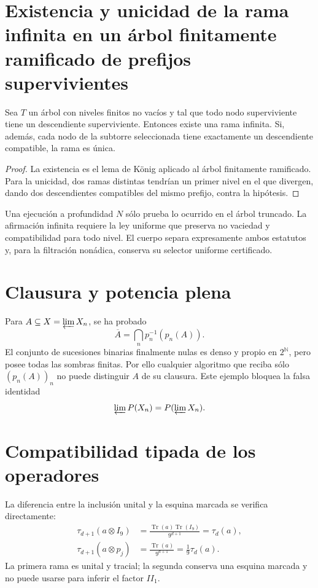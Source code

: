 \section{Existencia y unicidad de la rama infinita en un árbol finitamente ramificado de prefijos supervivientes}

\begin{lemma}
Sea \(T\) un árbol con niveles finitos no vacíos y tal que todo nodo
superviviente tiene un descendiente superviviente. Entonces existe una rama
infinita. Si, además, cada nodo de la subtorre seleccionada tiene exactamente
un descendiente compatible, la rama es única.
\end{lemma}

\begin{proof}
La existencia es el lema de König aplicado al árbol finitamente ramificado.
Para la unicidad, dos ramas distintas tendrían un primer nivel en el que
divergen, dando dos descendientes compatibles del mismo prefijo, contra la
hipótesis.
\end{proof}

\begin{controlbox}
Una ejecución a profundidad \(N\) sólo prueba lo ocurrido en el árbol
truncado. La afirmación infinita requiere la ley uniforme que preserva no
vaciedad y compatibilidad para todo nivel. El cuerpo separa expresamente
ambos estatutos y, para la filtración nonádica, conserva su selector uniforme
certificado.
\end{controlbox}

\section{Clausura y potencia plena}

Para \(A\subseteq X=\varprojlim X_n\), se ha probado
\[
 \overline A=\bigcap_n p_n^{-1}(p_n(A)).
\]
El conjunto de sucesiones binarias finalmente nulas es denso y propio en
\(2^{\mathbb N}\), pero posee todas las sombras finitas. Por ello cualquier
algoritmo que reciba sólo \((p_n(A))_n\) no puede distinguir \(A\) de su
clausura. Este ejemplo bloquea la falsa identidad
\[
 \varprojlim\mathcal P(X_n)=\mathcal P(\varprojlim X_n).
\]

\section{Compatibilidad tipada de los operadores}

La diferencia entre la inclusión unital y la esquina marcada se verifica
directamente:
\[
\begin{aligned}
 \tau_{d+1}(a\otimes I_9)
 &=\frac{\operatorname{Tr}(a)\operatorname{Tr}(I_9)}{9^{d+1}}
 =\tau_d(a),\\
 \tau_{d+1}(a\otimes p_j)
 &=\frac{\operatorname{Tr}(a)}{9^{d+1}}
 =\frac1{9}\tau_d(a).
\end{aligned}
\]
La primera rama es unital y tracial; la segunda conserva una esquina marcada
y no puede usarse para inferir el factor \(II_1\).

